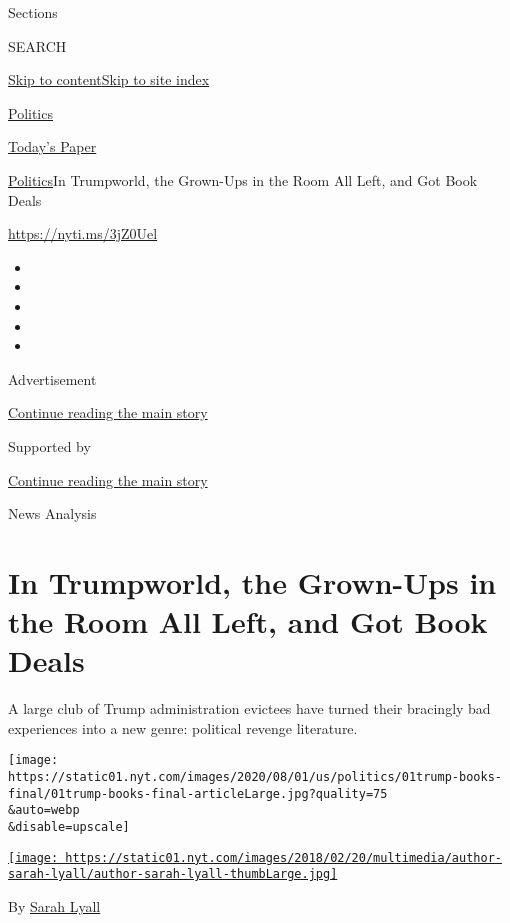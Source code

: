 Sections

SEARCH

\protect\hyperlink{site-content}{Skip to
content}\protect\hyperlink{site-index}{Skip to site index}

\href{https://www.nytimes.com/section/politics}{Politics}

\href{https://myaccount.nytimes.com/auth/login?response_type=cookie\&client_id=vi}{}

\href{https://www.nytimes.com/section/todayspaper}{Today's Paper}

\href{/section/politics}{Politics}\textbar{}In Trumpworld, the Grown-Ups
in the Room All Left, and Got Book Deals

\url{https://nyti.ms/3jZ0Uel}

\begin{itemize}
\item
\item
\item
\item
\item
\end{itemize}

Advertisement

\protect\hyperlink{after-top}{Continue reading the main story}

Supported by

\protect\hyperlink{after-sponsor}{Continue reading the main story}

News Analysis

\hypertarget{in-trumpworld-the-grown-ups-in-the-room-all-left-and-got-book-deals}{%
\section{In Trumpworld, the Grown-Ups in the Room All Left, and Got Book
Deals}\label{in-trumpworld-the-grown-ups-in-the-room-all-left-and-got-book-deals}}

A large club of Trump administration evictees have turned their
bracingly bad experiences into a new genre: political revenge
literature.

\texttt{[image: https://static01.nyt.com/images/2020/08/01/us/politics/01trump-books-final/01trump-books-final-articleLarge.jpg?quality=75\\\&auto=webp\\\&disable=upscale]}

\href{https://www.nytimes.com/by/sarah-lyall}{\texttt{[image: https://static01.nyt.com/images/2018/02/20/multimedia/author-sarah-lyall/author-sarah-lyall-thumbLarge.jpg]}}

By \href{https://www.nytimes.com/by/sarah-lyall}{Sarah Lyall}

